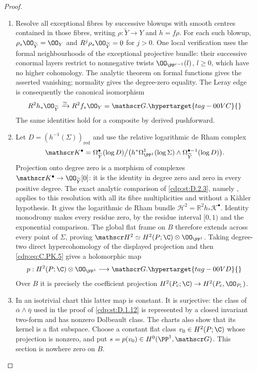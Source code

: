 \begin{proof}
\begin{enumerate}[leftmargin=*]
\item Resolve all exceptional
fibres by successive blowups with smooth centres contained
in those fibres, writing
$\rho:\widetilde Y\to Y$ and $h=f\rho$. For each such
blowup, $\rho_*\OO_{\widetilde Y}=\OO_Y$ and
$R^j\rho_*\OO_{\widetilde Y}=0$ for $j>0$.
One local verification uses the formal neighbourhoods of
the exceptional projective bundle: their successive
conormal layers restrict to nonnegative twists
$\OO_{\PP^{r-1}}(l)$, $l\ge0$, which have no higher
cohomology. The analytic theorem on formal functions
gives the asserted vanishing; normality gives the
degree-zero equality. The Leray edge is consequently the
canonical isomorphism
\begin{equation}
 R^2h_*\OO_{\widetilde Y}\xrightarrow{\simeq}
 R^2f_*\OO_Y=\mathscr G.
\hypertarget{tag-00VC}{}\label{cdp:eq:C.PK.5}
\end{equation}
The same identities hold for a composite by derived
pushforward.

\item Let $D=(h^{-1}(\Sigma))_{\mathrm{red}}$ and use the
relative logarithmic de Rham complex
\[
 \mathscr K^\bullet=
 \Omega_{\widetilde Y}^\bullet(\log D)\big/
 \bigl(h^*\Omega_{\PP^1}^1(\log\Sigma)
       \wedge\Omega_{\widetilde Y}^{\bullet-1}(\log D)\bigr).
\]
Projection onto degree zero is a morphism of complexes
$\mathscr K^\bullet\to\OO_{\widetilde Y}[0]$:
it is the identity in degree zero and zero in every
positive degree. The exact analytic comparison of \ref{cdp:st:D.2.3},
namely \cite[Theorem~2.18 and \S\S2.19--2.21]{Steenbrink1976},
applies to this resolution with all its fibre multiplicities
and without a K\"ahler hypothesis. It gives the logarithmic
de Rham bundle
$\mathscr H^2=\mathbb R^2h_*\mathscr K^\bullet$.
Identity monodromy makes every residue zero, by the
residue interval $[0,1)$ and the exponential comparison.
The global flat frame on $B$ therefore extends across
every point of $\Sigma$, proving
$\mathscr H^2\simeq H^2(P;\C)\otimes\OO_{\PP^1}$.
Taking degree-two direct hypercohomology of the displayed
projection and then \eqref{cdp:eq:C.PK.5} gives a holomorphic map
\begin{equation}
 p:H^2(P;\C)\otimes\OO_{\PP^1}
          \longrightarrow\mathscr G.
\hypertarget{tag-00VD}{}\label{cdp:eq:C.PK.6}
\end{equation}
Over $B$ it is precisely the coefficient projection
$H^2(P_c;\C)\to H^2(P_c,\OO_{P_c})$.

\item In an isotrivial chart this latter map is constant. It is
surjective: the class of
$\overline\alpha\wedge\overline\eta$ used in the proof
of \ref{cdp:st:D.1.12} is represented by a closed invariant two-form
and has nonzero Dolbeault class. The charts also show
that its kernel is a flat subspace. Choose a constant flat
class $v_0\in H^2(P;\C)$ whose projection is nonzero,
and put $s=p(v_0)\in H^0(\PP^1,\mathscr G)$.
This section is nowhere zero on $B$.


\end{enumerate}
\end{proof}
